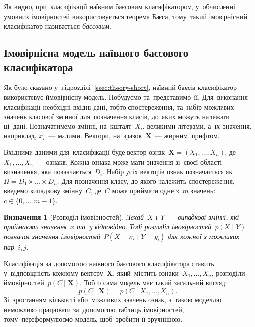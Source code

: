 \documentclass[
	a4paper,
	oneside,
	DIV = 12,
	fontsize = 13pt,
	headings = normal,
	numbers = endperiod,
	bibliography = totoc, %
]{scrartcl}
\theoremstyle{mythm}
\newtheorem{mydef}{Визначення}
\newcommand{\myvec}[1]{\mathbf{#1}}
\begin{document}
			Як видно, при~класифікації наївним баєсовим класифікатором, у~обчисленні умовних імовірностей використовується теорема Баєса, тому~такий імовірнісний класифікатор називається \emph{баєсовим}.

		\subsection{Імовірнісна модель наївного баєсового класифікатора}
			Як було сказано у~підрозділі~\ref{ssec:theory-short}, наївний баєсів класифікатор використовує ймовірнісну модель. Побудуємо та~представимо~її. Для~виконання класифікації необхідні вхідні дані, тобто спостереження, та~набір можливих значень класової змінної для~позначення класів, до~яких можуть належати ці~дані. Позначатимемо змінні, на~кшталт~$X_i$, великими літерами, а~їх~значення, наприклад, $x_i$~— малими. Вектори, на~зразок~$\myvec{X}$~— жирним шрифтом.
			
			Вхідними даними для~класифікації буде вектор ознак~$\myvec{X} = \left( X_1, \dots, X_n \right)$, де~$X_1, \dots, X_n$~— ознаки. Кожна ознака може мати значення зі~своєї області визначення, яка позначається~$D_i$. Набір усіх векторів ознак позначається як~$\Omega = D_1 \times \dots \times D_n$. Для позначення класу, до якого належить спостереження, введемо випадкову змінну~$C$, де~$C$ може приймати одне з~$m$ значень: $c \in \{ 0, \dots, m - 1\}$. 

			\begin{mydef}[Розподіл імовірностей]
				Нехай~$X$ і~$Y$~— випадкові змінні, які приймають значення~$x$ та~$y$ відповідно. Тоді розподіл імовірностей~$p(X \mid Y)$ позначає значення імовірностей~$P(X = x_i \mid Y = y_i)$ для кожної з можливих пар~$i, j$.~\cite{russel-norvig-ai-ma}
			\end{mydef}

			Класифікація за допомогою наївного баєсового класифікатора ставить у~відповідність кожному вектору~$\myvec{X}$, який~містить ознаки~$X_1, \dots, X_n$, розподіли ймовірностей~$p(C \mid \myvec{X})$. Тобто сама модель має такий загальний вигляд:
			\begin{equation}
				p\left( C \mid \myvec{X} \right) = p\left( C \mid X_1, \dots, X_n \right).
			\end{equation}
			Зі~зростанням кількості або~можливих значень ознак, з~такою моделлю неможливо працювати за~допомогою таблиць імовірностей, тому~переформулюємо модель, щоб~зробити її зручнішою.
\end{document}
